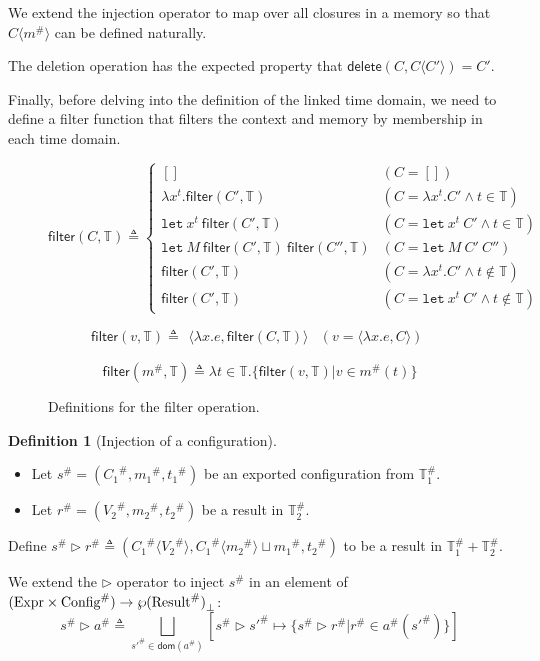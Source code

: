 \documentclass[acmsmall,screen]{acmart}
\theoremstyle{definition}
\newtheorem{definition}{Definition}[section]
\newcommand*{\A}[1]{{#1}^{\#}}
\newcommand*{\Expr}{\text{Expr}}
\newcommand*{\Time}{\mathbb{T}}
\newcommand*{\ATime}{\A{\Time}}
\newcommand*{\mem}{m}
\newcommand*{\AConfig}[1]{\A{\text{Config}}\vphantom{#1}}
\newcommand*{\AResult}[1]{\A{\text{Result}}\vphantom{#1}}
\newcommand*{\inject}[2]{{#1}\langle{#2}\rangle}
\newcommand*{\delete}{\mathsf{delete}}
\newcommand*{\filter}{\mathsf{filter}}
\newcommand*{\Let}{\mathtt{let}}
\begin{document}
We extend the injection operator to map over all closures in a memory so that $\inject{C}{\A\mem}$ can be defined naturally.

The deletion operation has the expected property that $\delete(C,\inject{C}{C'})=C'$.

Finally, before delving into the definition of the linked time domain, we need to define a filter function that filters the context and memory by membership in each time domain.

\begin{figure}[htb]
  \footnotesize
  \[
    \filter(C,\Time)\triangleq
    \begin{cases}
      []                                             & (C=[])                                   \\
      \lambda x^{t}.\filter(C',\Time)                & (C=\lambda x^{t}.C'\wedge t\in\Time)     \\
      \Let\:x^{t}\:\filter(C',\Time)                 & (C=\Let\:x^{t}\:C'\wedge t\in\Time)      \\
      \Let\:M\:\filter(C',\Time)\:\filter(C'',\Time) & (C=\Let\:M\:C'\:C'')                     \\
      \filter(C',\Time)                              & (C=\lambda x^{t}.C'\wedge t\not\in\Time) \\
      \filter(C',\Time)                              & (C=\Let\:x^{t}\:C'\wedge t\not\in\Time)
    \end{cases}
  \]

  \[
    \filter(v,\Time)\triangleq
    \begin{array}{ll}
      \langle\lambda x.e,\filter(C,\Time)\rangle & (v=\langle\lambda x.e,C\rangle)
    \end{array}
  \]

  \[
    \filter(\A\mem,\Time)\triangleq
    \lambda t\in\Time.\{\filter(v,\Time)|v\in\A{m}(t)\}
  \]
  \caption{Definitions for the filter operation.}
\end{figure}

\begin{definition}[Injection of a configuration]
  $\:$

  \begin{itemize}
    \item Let $\A{s}=(\A{C_1},\A{\mem_1},\A{t_1})$ be an exported configuration from $\ATime_1$.
    \item Let $\A{r}=(\A{V_2},\A{\mem_2},\A{t_2})$ be a result in $\ATime_2$.
  \end{itemize}

  Define $\A{s}\rhd\A{r}\triangleq(\A{C_1}\langle\A{V_2}\rangle,\A{C_1}\langle\A{\mem_2}\rangle\sqcup\A{\mem_1},\A{t_2})$ to be a result in $\ATime_1+\ATime_2$.

  We extend the $\rhd$ operator to inject $\A{s}$ in an element of $(\Expr\times\AConfig{\ATime})\rightarrow{\wp(\AResult{\ATime})}_{\bot}$:
  \[
    \A{s}\rhd\A{a}\triangleq\bigsqcup_{\A{s'}\in\mathsf{dom}(\A{a})}[\A{s}\rhd\A{s'}\mapsto\{\A{s}\rhd\A{r}|\A{r}\in\A{a}(\A{s'})\}]
  \]
\end{definition}
\end{document}
